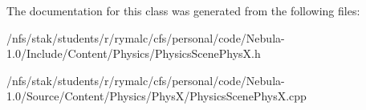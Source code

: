 The documentation for this class was generated from the following files:\begin{DoxyCompactItemize}
\item 
/nfs/stak/students/r/rymalc/cfs/personal/code/Nebula-\/1.0/Include/Content/Physics/PhysicsScenePhysX.h\item 
/nfs/stak/students/r/rymalc/cfs/personal/code/Nebula-\/1.0/Source/Content/Physics/PhysX/PhysicsScenePhysX.cpp\end{DoxyCompactItemize}
